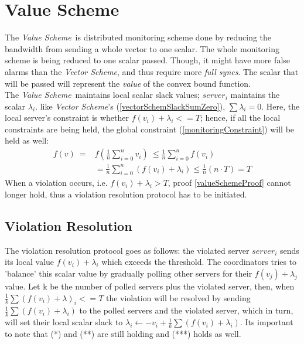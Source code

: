 \documentclass[10pt, conference]{IEEEtran}
\newcommand{\vecScheme}{\textit{Vector Scheme}}
\newcommand{\valueScheme}{\textit{Value Scheme}}
\begin{document}
\section{Value Scheme}
The \valueScheme \ is distributed monitoring scheme done by reducing the bandwidth from sending a whole vector to one scalar. The whole monitoring scheme is being reduced to one scalar passed. Though, it might have more false alarms than the \vecScheme , and thus require more \textit{full syncs}. The scalar that will be passed will represent the \textit{value} of the convex bound function.\\
The \valueScheme \  maintains local scalar slack values; $server_i$ maintains the scalar $\lambda _i$. like \vecScheme 's (\ref{vectorSchemSlackSumZero}), $\sum{\lambda _i} = 0$. Here, the local server's constraint is whether $f(v_i) + \lambda _i <= T$; hence, if all the local constraints are being held, the global constraint (\ref{monitoringConstraint}) will be held as well:
\begin{equation}
\label{valueSchemeProof}
\begin{aligned}
 f(v)  \
	    ={} & f\left(\frac{1}{n} \sum\limits_{i=0}^{n}{v_i}\right)  \
       \leq   \frac{1}{n} \sum\limits_{i=0}^{n}f(v_i) \\
     &  =   \frac{1}{n} \sum\limits_{i=0}^{n}{(f(v_i) + \lambda _i)}
       \leq   \frac{1}{n}(n \cdot T)
        = T
\end{aligned}
\end{equation}
When a violation occurs, i.e. $f(v_i) + \lambda _i > T$, proof \ref{valueSchemeProof} cannot longer hold, thus a violation resolution protocol has to be initiated.
\subsection{Violation Resolution}
The violation resolution protocol goes as follows: the violated server $server_i$ sends its local value $f(v_i) + \lambda _i$ which exceeds the threshold. The coordinators tries to 'balance' this scalar value by gradually polling other servers for their $f(v_j) + \lambda _j$ value. Let k be the number of polled servers plus the violated server, then, when $\frac{1}{k}\sum{(f(v_i) + \lambda ) _i} <= T$ the violation will be resolved by sending $\frac{1}{k}\sum{(f(v_i) + \lambda _i)}$ to the polled servers and the violated server, which in turn, will set their local scalar slack to $\lambda _i \leftarrow -v_i + \frac{1}{k}\sum{(f(v_i) + \lambda _i)}$. Its important to note that (*) and (**) are still holding and (***) holds as well.
\end{document}
